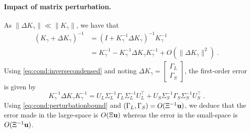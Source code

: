 \paragraph{Impact of matrix perturbation.}
As $\|\Delta K_\gamma\| \ll \|K_\gamma\|$, we have that
\begin{equation}
  \label{eq:cond:invperturbed}
  \begin{aligned}
    (K_\gamma + \Delta K_\gamma)^{-1} &= (I + K_\gamma^{-1} \Delta K_\gamma)^{-1} K_\gamma^{-1} \\
                                      &= K_\gamma^{-1} - K_\gamma^{-1}\Delta K_\gamma K_\gamma^{-1} + O(\|\Delta K_\gamma\|^2) \; .
  \end{aligned}
\end{equation}
Using \eqref{eq:cond:inversecondensed} and noting $\Delta K_\gamma = \begin{bmatrix}
  \Gamma_L \\ \Gamma _S
\end{bmatrix}$, the first-order error is given by
\begin{equation}
  \label{eq:cond:inversecondensederror}
  K_\gamma^{-1}\Delta K_\gamma K_\gamma^{-1}  =
U_L \Sigma_L^{-1} \Gamma_L \Sigma_L^{-1}U_L^\top  +
  U_S \Sigma_S^{-1} \Gamma_S \Sigma_S^{-1}U_S^\top  \;.
\end{equation}
Using \eqref{eq:cond:perturbationbound} and $(\Gamma_L, \Gamma_S)= O( \Xi^{-1}\mathbf{u})$,
we deduce that the error made in the large-space is $O(\Xi\mathbf{u})$ whereas
the error in the small-space is $O(\Xi^{-1}\mathbf{u} )$.

